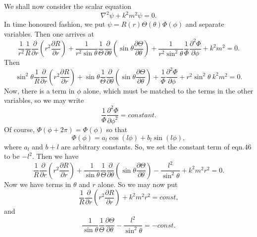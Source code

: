 \documentclass[12pt]{article}
\begin{document}
We shall now consider the scalar equation
\begin{equation}
\nabla^2 \psi +k^2 m^2 \psi=0.
\end{equation}
In time honoured fashion, we put $\psi= R(r) \Theta(\theta)\Phi(\phi)$ and separate variables.
Then one arrives at
\begin{equation}
\frac{1}{r^2} \frac{1}{R} \frac{\partial}{\partial r} \left ( r^2 \frac{\partial R}{\partial r} \right )
+ \frac{1}{r^2 \sin \theta} \frac{1}{\Theta} \frac{\partial}{\partial \theta}
\left ( \sin \theta \frac{\partial \Theta}{ \partial \theta} \right )
+\frac{1}{r^2 \sin^2 \theta} \frac{1}{\Phi} \frac{\partial^2 \Phi}{\partial \phi}+k^2 m^2=0.
\end{equation}
Then
\begin{equation}
\sin^2 \theta \frac{1}{R} \frac{\partial}{\partial r} \left ( r^2 \frac{\partial R}{\partial r} \right )
+  \sin \theta \frac{1}{\Theta} \frac{\partial}{\partial \theta}
\left ( \sin \theta \frac{\partial \Theta}{ \partial \theta} \right )
+ \frac{1}{\Phi} \frac{\partial^2 \Phi}{\partial \phi}+r^2 \sin^2 \theta \> k^2 m^2=0.
\end{equation}
Now, there is a term in $\phi$ alone, which must be matched to the terms in
the other variables, so we may write
\begin{equation}
\frac{1}{\Phi} \frac{ \partial^2 \Phi}{\partial \phi^2}=constant.
\end{equation}
Of course, $\Phi(\phi+2 \pi)=\Phi(\phi)$ so that 
\begin{equation}
\Phi(\phi)=a_l \cos( l \phi)+b_l \sin(l \phi),
\end{equation}
where $a_l$ and $b+l$ are arbitrary constants. So, we set the constant term of eqn.46 to be $-l^2$. Then we have
\begin{equation}
 \frac{1}{R} \frac{\partial}{\partial r} \left ( r^2 \frac{\partial R}{\partial r} \right )
+ \frac{1}{\sin \theta} \frac{1}{\Theta} \frac{\partial}{\partial \theta}
\left ( \sin \theta \frac{\partial \Theta}{ \partial \theta} \right )
-\frac{l^2}{ \sin^2 \theta} +k^2 m^2 r^2=0.
\end{equation}
Now we have terms in $\theta$ and $r$ alone. So we may now put
\begin{equation}
 \frac{1}{R} \frac{\partial}{\partial r} \left ( r^2 \frac{\partial R}{\partial r} \right )
 +k^2 m^2 r^2=const,
\end{equation}
and
\begin{equation}
 \frac{1}{\sin \theta} \frac{1}{\Theta} \frac{\partial \Theta}{\partial \theta}
-\frac{l^2}{ \sin^2 \theta} =-const.
\end{equation}
\end{document}
